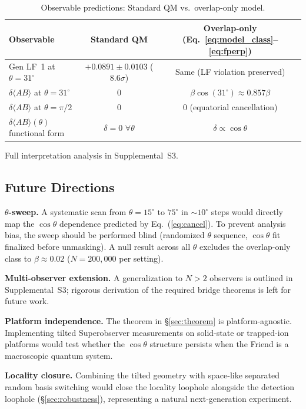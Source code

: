 \documentclass[twocolumn,aps,pra,superscriptaddress,floatfix,10pt]{revtex4-2}
\begin{document}
\begin{table}[H]
\centering
\caption{Observable predictions: Standard QM vs.\ overlap-only model.}
\label{tab:observables}
\begin{tabular}{p{}cc}
\toprule
Observable & Standard QM & Overlap-only (Eq.~\ref{eq:model_class}--\ref{eq:fperp}) \\
\midrule
Gen LF~1 at $\theta = 31^\circ$ & $+0.0891 \pm 0.0103$ ($8.6\sigma$) & Same (LF violation preserved) \\
$\delta\langle AB\rangle$ at $\theta = 31^\circ$ & $0$ & $\beta\cos(31^\circ) \approx 0.857\beta$ \\
$\delta\langle AB\rangle$ at $\theta = \pi/2$ & $0$ & $0$ (equatorial cancellation) \\
$\delta\langle AB\rangle(\theta)$ functional form & $\delta = 0$ $\forall\theta$ & $\delta \propto \cos\theta$ \\
\bottomrule
\end{tabular}
\end{table}

Full interpretation analysis in Supplemental~S3.

\subsection{Future Directions}
\label{sec:future}

\textbf{$\theta$-sweep.} A systematic scan from $\theta = 15^\circ$ to $75^\circ$ in $\sim\!10^\circ$ steps would
directly map the $\cos\theta$ dependence predicted by Eq.~(\ref{eq:cancel}). To prevent
analysis bias, the sweep should be performed blind (randomized $\theta$ sequence,
$\cos\theta$ fit finalized before unmasking). A null result across all $\theta$
excludes the overlap-only class to $\beta \approx 0.02$ ($N = 200{,}000$ per setting).

\textbf{Multi-observer extension.} A generalization to $N > 2$ observers is
outlined in Supplemental~S3; rigorous derivation of the required bridge
theorems is left for future work.

\textbf{Platform independence.} The theorem in \S\ref{sec:theorem} is platform-agnostic.
Implementing tilted Superobserver measurements on solid-state or
trapped-ion platforms would test whether the $\cos\theta$ structure persists
when the Friend is a macroscopic quantum system.

\textbf{Locality closure.} Combining the tilted geometry with space-like
separated random basis switching would close the locality loophole
alongside the detection loophole (\S\ref{sec:robustness}), representing a natural
next-generation experiment.
\end{document}

